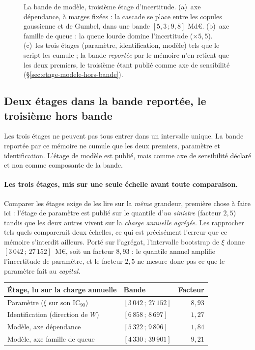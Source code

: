 \begin{figure}[htbp]\centering
{}
\caption{La bande de modèle, troisième étage d'incertitude. (a)~axe dépendance, à
marges fixées : la cascade se place entre les copules gaussienne et de Gumbel, dans une bande
$[5{,}3\,;9{,}8]$ Md\euro. (b)~axe famille de queue : la queue lourde domine
l'incertitude ($\times 5{,}5$). (c)~les trois étages (paramètre, identification,
modèle) tels que le script les cumule ; la bande \emph{reportée} par le mémoire n'en retient que
les deux premiers, le troisième étant publié comme axe de sensibilité
(\S\ref{sec:etage-modele-hors-bande}).}
\label{fig:bande-modele}
\end{figure}

\subsection{Deux étages dans la bande reportée, le troisième hors bande}

Les trois étages ne peuvent pas tous entrer dans un intervalle unique. La bande reportée par ce mémoire ne cumule que les deux premiers,
paramètre et identification. L'étage de modèle est publié, mais comme axe de
sensibilité déclaré et non comme composante de la bande.

\paragraph{Les trois étages, mis sur une seule échelle avant toute comparaison.} Comparer les
étages exige de les lire sur la \emph{même} grandeur, première chose à faire ici :
l'étage de paramètre est publié sur le quantile d'\emph{un sinistre} (facteur $2{,}5$) tandis que
les deux autres vivent sur la \emph{charge annuelle agrégée}. Les rapprocher tels quels
comparerait deux échelles, ce qui est précisément l'erreur que ce mémoire s'interdit ailleurs.
Porté sur l'agrégat, l'intervalle bootstrap de $\xi$ donne $[3\,042\,;\,27\,152]$~M\euro, soit un
facteur $8{,}93$ : le quantile annuel amplifie l'incertitude de paramètre, et le facteur
$2{,}5$ ne mesure donc pas ce que le paramètre fait au \emph{capital}.

\begin{center}\footnotesize
\renewcommand{\arraystretch}{1.25}
\begin{tabular}{@{}l l r@{}}
\toprule
\textbf{Étage, lu sur la charge annuelle} & \textbf{Bande} & \textbf{Facteur} \\
\midrule
Paramètre ($\xi$ sur son IC$_{90}$) & $[3\,042\,;\,27\,152]$ & $8{,}93$ \\
Identification (direction de $W$) & $[6\,858\,;\,8\,697]$ & $1{,}27$ \\
Modèle, axe dépendance & $[5\,322\,;\,9\,806]$ & $1{,}84$ \\
Modèle, axe famille de queue & $[4\,330\,;\,39\,901]$ & $9{,}21$ \\
\bottomrule
\end{tabular}
\end{center}

